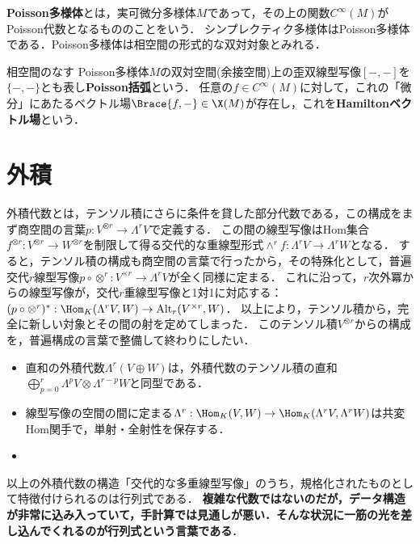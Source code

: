 \documentclass[uplatex,dvipdfmx]{jsreport}
\begin{document}
\begin{definition}
    \textbf{Poisson多様体}とは，実可微分多様体$M$であって，その上の関数$C^\infty(M)$がPoisson代数となるもののことをいう．
    シンプレクティク多様体はPoisson多様体である．Poisson多様体は相空間の形式的な双対対象とみれる．
\end{definition}

\begin{example}
    相空間のなす
    Poisson多様体$M$の双対空間(余接空間)上の歪双線型写像$[-,-]$を$\{-,-\}$とも表し\textbf{Poisson括弧}という．
    任意の$f\in C^\infty(M)$に対して，これの「微分」にあたるベクトル場$\Brace{f,-}\in\X(M)$が存在し，これを\textbf{Hamiltonベクトル場}という．
\end{example}

\section{外積}

\begin{tcolorbox}[colframe=ForestGreen, colback=ForestGreen!10!white, breakable,
    title=外積代数とその圏と，行列式という言葉]
    外積代数とは，テンソル積にさらに条件を貸した部分代数である，この構成をまず商空間の言葉$p:V^{\otimes r}\to\Lambda^rV$で定義する．
    この間の線型写像はHom集合$f^{\otimes r}:V^{\otimes r}\to W^{\otimes r}$を制限して得る交代的な重線型形式$\wedge^rf:\Lambda^rV\to\Lambda^rW$となる．
    すると，テンソル積の構成も商空間の言葉で行ったから，その特殊化として，普遍交代$r$線型写像$p\circ\otimes^r:V^{\times r}\to\Lambda^rV$が全く同様に定まる．
    これに沿って，$r$次外冪からの線型写像が，交代$r$重線型写像と1対1に対応する：$(p\circ\otimes^r)^*:\Hom_K(\Lambda^rV,W)\to\mathrm{Alt}_r(V^{\times r},W)$．
    以上により，テンソル積から，完全に新しい対象とその間の射を定めてしまった．
    このテンソル積$V^{\otimes r}$からの構成を，普遍構成の言葉で整備して終わりにしたい．
    \begin{itemize}
        \item 直和の外積代数$\Lambda^r(V\oplus W)$は，外積代数のテンソル積の直和$\bigoplus_{p=0}^r\Lambda^pV\otimes\Lambda^{r-p}W$と同型である．
        \item 線型写像の空間の間に定まる$\Lambda^r:\Hom_K(V,W)\to\Hom_K(\Lambda^rV,\Lambda^rW)$は共変Hom関手で，単射・全射性を保存する．
        \item 
    \end{itemize}
    以上の外積代数の構造「交代的な多重線型写像」のうち，規格化されたものとして特徴付けられるのは行列式である．
    \textbf{複雑な代数ではないのだが，データ構造が非常に込み入っていて，手計算では見通しが悪い．そんな状況に一筋の光を差し込んでくれるのが行列式という言葉である}．
\end{tcolorbox}
\end{document}
